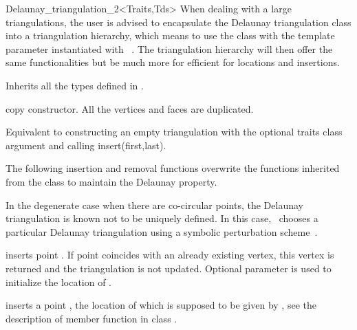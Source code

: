 \begin{ccRefClass}{Delaunay_triangulation_2<Traits,Tds>}
When dealing
with a large triangulations, the user is advised to 
encapsulate  the Delaunay triangulation class into a
triangulation hierarchy, which means to use  the class
with the template parameter instantiated with \ccRefName\ .
The triangulation hierarchy will then  offer the same 
functionalities  but be much more for efficient 
for locations and insertions.



\ccInheritsFrom


\ccTypes
Inherits all the types defined in  .

\ccCreation
{}  %


{copy constructor. All the vertices and faces are duplicated.}

{Equivalent to constructing an empty triangulation with the optional traits class argument and calling insert(first,last).}


The following insertion and removal  functions overwrite
the functions inherited from the class
 to maintain the Delaunay property.

In the degenerate case when there are co-circular points, the Delaunay
triangulation is known not to be uniquely defined. In this case, \cgal\ 
chooses a particular Delaunay triangulation using a symbolic perturbation
scheme~\cite{cgal:dt-pvr3d-03}.


{inserts  point .
If point \ccc{p} coincides with an already existing vertex, this 
vertex is returned and the triangulation is not updated.
Optional parameter  is used to initialize the location of .
}

{ inserts a point , the location of which is supposed to be
given by \ccc{(lt,loc,li)}, see the description of member function
\ccc{locate} in class \ccc{Triangulation_2<Traits,Tds>}.}


\end{ccRefClass}
